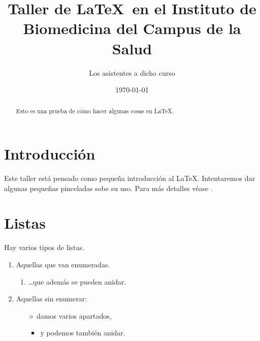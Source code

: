 \documentclass[11pt]{amsart}
\title[Taller de \LaTeX]{Taller de \LaTeX\ en el Instituto de Biomedicina del Campus de la Salud}
\author[Los presentes]{Los asistentes a dicho curso}
\date{\today}
\begin{document}
\begin{abstract}
Esto es una prueba de cómo hacer algunas cosas en \LaTeX. 
\end{abstract}

\maketitle

\tableofcontents


\section*{Introducción}

Este taller está pensado como pequeña introducción al \LaTeX. Intentaremos dar algunas pequeñas pinceladas sobe su uso. Para m\'as detalles véase \cite{lshort}.

\section{Listas}

Hay varios tipos de listas.
\begin{enumerate}[1)]
\item Aquellas que van enumeradas.
	\begin{enumerate}
	\item \ldots que además se pueden anidar.
	\end{enumerate}

\item Aquellas sin enumerar:
\begin{itemize}
\item[$\diamond$] damos varios apartados, %
\begin{itemize}
\item y podemos también anidar.
\end{itemize}
\end{itemize}
\end{enumerate}
\end{document}
